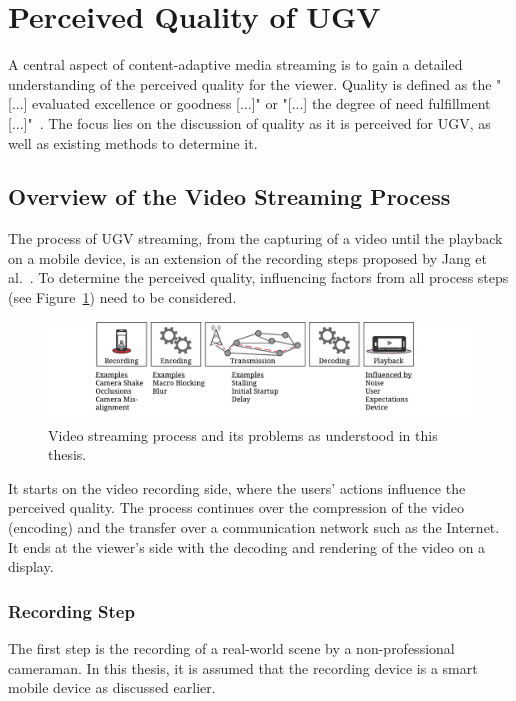 \section{Perceived Quality of UGV}
\label{sec:210_quality_assessment}
A central aspect of content-adaptive media streaming is to gain a detailed understanding of the perceived quality for the viewer.
Quality is defined as the "[...] evaluated excellence or goodness [...]" or "[...] the degree of need fulfillment [...]"~\cite[4]{Qualinet2013}.
The focus lies on the discussion of quality as it is perceived for \ac{UGV}, as well as existing methods to determine it.
\subsection{Overview of the Video Streaming Process}
\label{sec:210_streaming_process}
The process of \ac{UGV} streaming, from the capturing of a video until the playback on a mobile device, is an extension of the recording steps proposed by Jang et al.~\cite{Jang2016}.
To determine the perceived quality, influencing factors from all process steps (see Figure~\ref{fig:210_recordingprocess}) need to be considered.
\begin{figure}[tbh]
\centering
\includegraphics[width=\linewidth]{gfx/200_Background/Recording_Process}
\caption[Video streaming process]{Video streaming process and its problems as understood in this thesis.}
\label{fig:210_recordingprocess}
\end{figure}

It starts on the video recording side, where the users' actions influence the perceived quality.
The process continues over the compression of the video (encoding) and the transfer over a communication network such as the Internet.
It ends at the viewer's side with the decoding and rendering of the video on a display.
\subsubsection{Recording Step}
The first step is the recording of a real-world scene by a non-professional cameraman.
In this thesis, it is assumed that the recording device is a smart mobile device as discussed earlier. 

